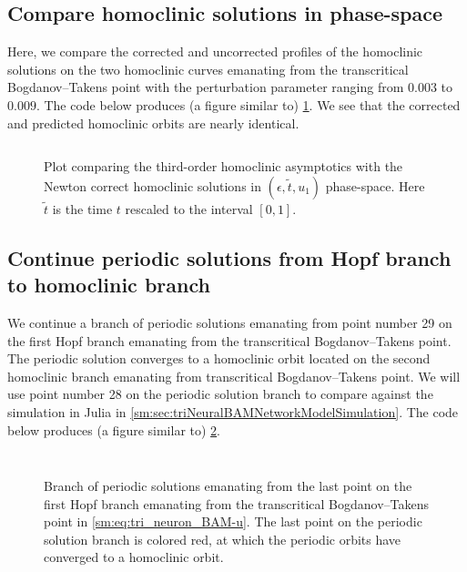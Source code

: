 \subsection{Compare homoclinic solutions in phase-space}
Here, we compare the corrected and uncorrected profiles of the homoclinic
solutions on the two homoclinic curves emanating from the transcritical
Bogdanov--Takens point with the perturbation parameter ranging from $0.003$ to
$0.009$.
The code below produces (a figure similar to)
\cref{sm:fig:triNeuronBAMNeuralNetworkModelCompareOrbitsPhaseSpace}. We see
that the corrected and predicted homoclinic orbits are nearly identical.
\inputminted[firstline=356, lastline=385]{MATLAB}{\pathToDDEBifToolDemos/BAM_neural_network_model/BAMnn.m}
%
\begin{figure}[ht]
    \caption{Plot comparing the third-order homoclinic asymptotics with the
        Newton correct homoclinic solutions in $(\epsilon,\tilde t, u_1)$
        phase-space. Here $\tilde t$ is the time $t$ rescaled to the interval
        $[0,1]$.
    }
    \label{sm:fig:triNeuronBAMNeuralNetworkModelCompareOrbitsPhaseSpace}
\end{figure}

\subsection{Continue periodic solutions from Hopf branch to homoclinic branch}
We continue a branch of periodic solutions emanating from point number 29 on the
first Hopf branch emanating from the transcritical Bogdanov--Takens point. The
periodic solution converges to a homoclinic orbit located on the second
homoclinic branch emanating from transcritical Bogdanov--Takens point. We will
use point number 28 on the periodic solution branch to compare against the
simulation in Julia in \cref{sm:sec:triNeuralBAMNetworkModelSimulation}. The
code below produces (a figure similar to)
\cref{sm:fig:triNeuronBAMNeuralNetworkModelPeriodicSolutions}.
\inputminted[firstline=387, lastline=391]{MATLAB}{\pathToDDEBifToolDemos/BAM_neural_network_model/BAMnn.m}
\vspace*{-12pt}
\inputminted[firstline=398, lastline=414]{MATLAB}{\pathToDDEBifToolDemos/BAM_neural_network_model/BAMnn.m}
\begin{figure}[ht]
    \caption{
        Branch of periodic solutions emanating from the last point on the first
        Hopf branch emanating from the transcritical Bogdanov--Takens point in
        \cref{sm:eq:tri_neuron_BAM-u}. The last point on the periodic solution
        branch is colored red, at which the periodic orbits have converged to
        a homoclinic orbit.
    }
    \label{sm:fig:triNeuronBAMNeuralNetworkModelPeriodicSolutions}
\end{figure}

